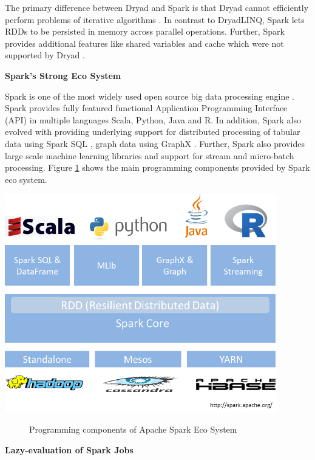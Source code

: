 The primary difference between Dryad and Spark is that Dryad cannot efficiently perform problems of iterative algorithms \cite{spark-vs-stratosphere}. In contrast to DryadLINQ, Spark lets RDDs to be persisted in memory across parallel operations. Further, Spark provides additional features like shared variables and cache which were not supported by Dryad \cite{Spark}.

\textbf{Spark's Strong Eco System}

Spark is one of the most widely used open source big data processing engine \cite{Spark-scalable}. Spark provides fully featured functional Application Programming Interface (API) in multiple languages Scala, Python, Java and R. In addition, Spark also evolved with providing underlying support for distributed processing of tabular data using Spark SQL \cite{SparkSQL}, graph data using GraphX \cite{GraphX}. Further, Spark also provides large scale machine learning libraries and support for stream and micro-batch processing. Figure \ref{fig:spark-prog-models} shows the main programming components provided by Spark eco system. 
 \begin{center}
	\includegraphics[width=32em]{./Figures/spark-programming-components}
	\begin{figure}[htbp]
    \caption{Programming components of Apache Spark Eco System}
    \label{fig:spark-prog-models}
	\end{figure}
\end{center}

\textbf{Lazy-evaluation of Spark Jobs} 

